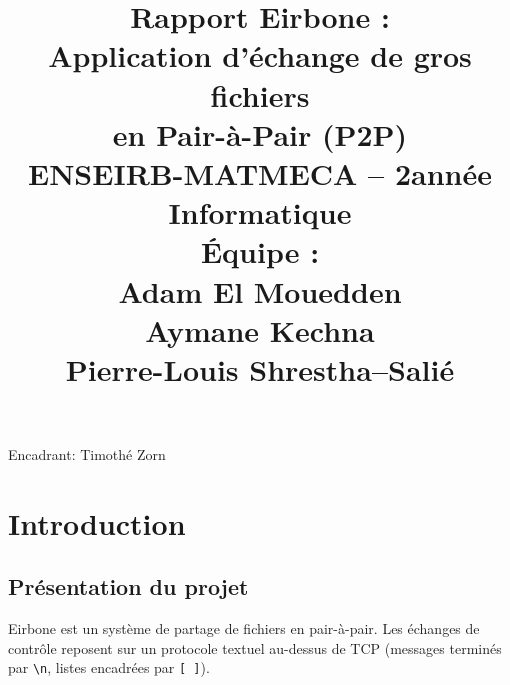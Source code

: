 \documentclass[11pt, a4paper]{article}
\begin{document}
\begin{titlepage}
\centering
\vspace*{1.5cm}

\vspace{1.8cm}

\begin{tcolorbox}[colback=lightblue, colframe=darkblue, width=0.78\textwidth,
                  title={ }, fonttitle=\bfseries]
\centering
\title{\LARGE\bfseries\color{darkblue} Rapport Eirbone :\\[0.2cm]\vspace*{0.5cm}
\large Application d'échange de gros fichiers\\ en Pair-à-Pair (P2P)\\[0.5cm]\vspace*{2.5cm}
\normalsize\normalfont ENSEIRB-MATMECA -- 2\ieme année Informatique\\[0.2cm]\vspace*{0.5cm}
Équipe :\\ Adam El Mouedden\\ Aymane Kechna\\ Pierre-Louis Shrestha--Salié}
\date{}
\maketitle
\end{tcolorbox}
Encadrant: Timothé Zorn



\end{titlepage}

\tableofcontents
\newpage

\section{Introduction}

\subsection{Présentation du projet}

 Eirbone est un système de partage de fichiers en pair-à-pair. Les échanges de contrôle reposent sur un
 protocole textuel au-dessus de TCP (messages terminés par \texttt{\textbackslash n}, listes encadrées
 par \texttt{[ ]}).
\end{document}
